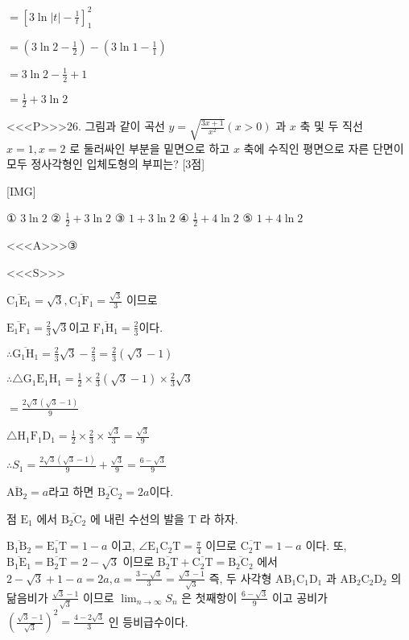 \documentclass{oblivoir}
\begin{document}
$=\left[3 \ln |t|-\frac{1}{t}\right]_{1}^{2}$

$=\left(3 \ln 2-\frac{1}{2}\right)-\left(3 \ln 1-\frac{1}{1}\right)$

$=3 \ln 2-\frac{1}{2}+1$

$=\frac{1}{2}+3 \ln 2$


<<<P>>>26. 그림과 같이 곡선 $y=\sqrt{\frac{3 x+1}{x^{2}}}(x>0)$ 과 $x$ 축 및 두 직선 $x=1, x=2$ 로 둘러싸인 부분을 밑면으로 하고 $x$ 축에 수직인 평면으로 자른 단면이 모두 정사각형인 입체도형의 부피는? [3점]

[IMG]

① $3 \ln 2$
② $\frac{1}{2}+3 \ln 2$
③ $1+3 \ln 2$
④ $\frac{1}{2}+4 \ln 2$
⑤ $1+4 \ln 2$



<<<A>>>③

<<<S>>>



$\overline{\mathrm{C}_{1} \mathrm{E}_{1}}=\sqrt{3}, \overline{\mathrm{C}_{1} \mathrm{F}_{1}}=\frac{\sqrt{3}}{3}$ 이므로

$\overline{\mathrm{E}_{1} \mathrm{F}_{1}}=\frac{2}{3} \sqrt{3}$이고 $\overline{\mathrm{F}_{1} \mathrm{H}_{1}}=\frac{2}{3}$이다.

$\therefore \overline{\mathrm{G}_{1} \mathrm{H}_{1}}=\frac{2}{3} \sqrt{3}-\frac{2}{3}=\frac{2}{3}(\sqrt{3}-1)$

$\therefore \triangle \mathrm{G}_{1} \mathrm{E}_{1} \mathrm{H}_{1}=\frac{1}{2} \times \frac{2}{3}(\sqrt{3}-1) \times \frac{2}{3} \sqrt{3}$

$=\frac{2 \sqrt{3}(\sqrt{3}-1)}{9}$

$\triangle \mathrm{H}_{1} \mathrm{F}_{1} \mathrm{D}_{1}=\frac{1}{2} \times \frac{2}{3} \times \frac{\sqrt{3}}{3}=\frac{\sqrt{3}}{9}$

$\therefore S_{1}=\frac{2 \sqrt{3}(\sqrt{3}-1)}{9}+\frac{\sqrt{3}}{9}=\frac{6-\sqrt{3}}{9}$

$\overline{\mathrm{AB}_{2}}=a$라고 하면 $\overline{\mathrm{B}_{2} \mathrm{C}_{2}}=2 a$이다.


점 $\mathrm{E}_{1}$ 에서 $\overline{\mathrm{B}_{2} \mathrm{C}_{2}}$ 에 내린 수선의 발을 $\mathrm{T}$ 라 하자.

$\overline{\mathrm{B}_{1} \mathrm{B}_{2}}=\overline{\mathrm{E}_{1} \mathrm{T}}=1-a$ 이고, $\angle \mathrm{E}_{1} \mathrm{C}_{2} \mathrm{T}=\frac{\pi}{4}$ 이므로 $\overline{\mathrm{C}_{2} \mathrm{T}}=1-a$ 이다. 또, $\overline{\mathrm{B}_{1} \mathrm{E}_{1}}=\overline{\mathrm{B}_{2} \mathrm{T}}=2-\sqrt{3}$ 이므로 $\overline{\mathrm{B}_{2} \mathrm{T}}+\overline{\mathrm{C}_{2} \mathrm{T}}=\overline{\mathrm{B}_{2} \mathrm{C}_{2}}$ 에서 $2-\sqrt{3}+1-a=2 a, a=\frac{3-\sqrt{3}}{3}=\frac{\sqrt{3}-1}{\sqrt{3}}$ 즉, 두 사각형 $\mathrm{AB}_{1} \mathrm{C}_{1} \mathrm{D}_{1}$ 과 $\mathrm{AB}_{2} \mathrm{C}_{2} \mathrm{D}_{2}$ 의 닮음비가 $\frac{\sqrt{3}-1}{\sqrt{3}}$ 이므로 $\lim _{n \rightarrow \infty} S_{n}$ 은 첫째항이 $\frac{6-\sqrt{3}}{9}$ 이고 공비가 $\left(\frac{\sqrt{3}-1}{\sqrt{3}}\right)^{2}=\frac{4-2 \sqrt{3}}{3}$ 인 등비급수이다.
\end{document}
